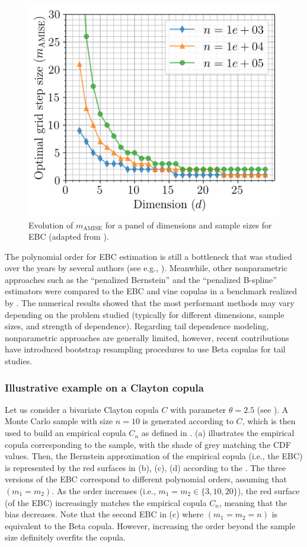 \begin{figure}
    \centering
    \includegraphics[width=0.5\linewidth]{../numerical_experiments/chapter3/figures/hAMISE.png}
    \caption{Evolution of $m_{\mathrm{AMISE}}$ for a panel of dimensions and sample sizes for EBC (adapted from \citealp{lasserre_2022}).}
    \label{fig:hmise}
\end{figure}

The polynomial order for EBC estimation is still a bottleneck that was studied over the years by several authors (see e.g., \citealp{janssen_2012_ebc,bouezmarni_2013_EBC_convergence,rose_2015,segers_2017}).  
Meanwhile, other nonparametric approaches such as the ``penalized Bernstein'' and the ``penalized B-spline'' estimators were compared to the EBC and vine copulas in a benchmark realized by \citet{nagler_2017}. 
The numerical results showed that the most performant methods may vary depending on the problem studied (typically for different dimensions, sample sizes, and strength of dependence). 
Regarding tail dependence modeling, nonparametric approaches are generally limited, however, recent contributions \citep{kiriliouk_2021_resampling} have introduced bootstrap resampling procedures to use Beta copulas for tail studies.


\subsubsection{Illustrative example on a Clayton copula}
Let us consider a bivariate Clayton copula $C$ with parameter $\theta=2.5$ (see \citealp{nelsen_2006_copulas}). 
A Monte Carlo sample with size $n=10$ is generated according to $C$, which is then used to build an empirical copula $C_n$ as defined in . 
 (a) illustrates the empirical copula corresponding to the sample, with the shade of grey matching the CDF values. 
Then, the Bernstein approximation of the empirical copula (i.e., the EBC)  is represented by the red surfaces in  (b), (c), (d) according to the . 
The three versions of the EBC correspond to different polynomial orders, assuming that $(m_1=m_2)$. 
As the order increases (i.e., $m_1=m_2 \in \{3, 10, 20\}$), the red surface (of the EBC) increasingly matches the empirical copula $C_n$, meaning that the bias decreases. 
Note that the second EBC in  (c) where $(m_1=m_2=n)$ is equivalent to the Beta copula. 
However, increasing the order beyond the sample size definitely overfits the copula. 

